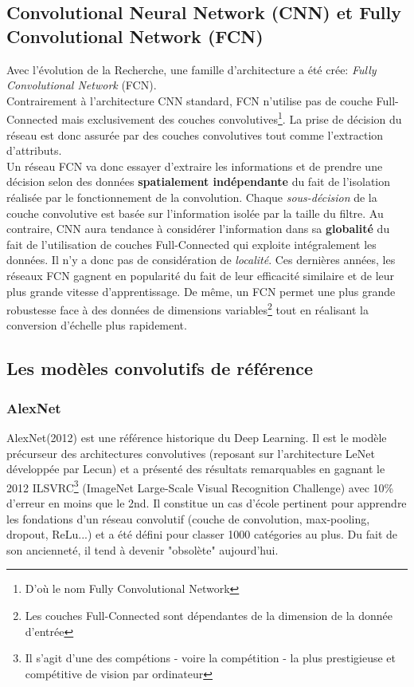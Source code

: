 \subsection{Convolutional Neural Network (CNN) et Fully Convolutional Network (FCN)}
Avec l'évolution de la Recherche, une famille d'architecture a été crée: \textit{Fully Convolutional Network}\cite{fcn} (FCN).\\

\noindent Contrairement à l'architecture CNN standard, FCN n'utilise pas de couche Full-Connected mais exclusivement des couches convolutives\footnote{D'où le nom Fully Convolutional Network}. La prise de décision du réseau est donc assurée par des couches convolutives tout comme l'extraction d'attributs.\\

\noindent Un réseau FCN va donc essayer d'extraire les informations et de prendre une décision selon des données \textbf{spatialement indépendante} du fait de l'isolation réalisée par le fonctionnement de la convolution. Chaque \textit{sous-décision} de la couche convolutive est basée sur l'information isolée par la taille du filtre. Au contraire, CNN aura tendance à considérer l'information dans sa \textbf{globalité} du fait de l'utilisation de couches Full-Connected qui exploite intégralement les données. Il n'y a donc pas de considération de \textit{localité}. Ces dernières années, les réseaux FCN gagnent en popularité du fait de leur efficacité similaire et de leur plus grande vitesse d'apprentissage. De même, un FCN permet une plus grande robustesse face à des données de dimensions variables\footnote{Les couches Full-Connected sont dépendantes de la dimension de la donnée d'entrée} tout en réalisant la conversion d'échelle plus rapidement.

\subsection{Les modèles convolutifs de référence}

\subsubsection{AlexNet}
AlexNet\cite{alexnet}(2012) est une référence historique du Deep Learning. Il est le modèle précurseur des architectures convolutives (reposant sur l'architecture LeNet développée par Lecun) et a présenté des résultats remarquables en gagnant le 2012 ILSVRC\footnote{Il s'agit d'une des compétions - voire la compétition - la plus prestigieuse et compétitive de vision par ordinateur} (ImageNet Large-Scale Visual Recognition Challenge) avec 10\% d'erreur en moins que le 2nd. Il constitue un cas d'école pertinent pour apprendre les fondations d'un réseau convolutif (couche de convolution, max-pooling, dropout, ReLu...) et a été défini pour classer 1000 catégories au plus. Du fait de son ancienneté, il tend à devenir "obsolète" aujourd'hui.


